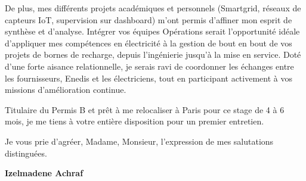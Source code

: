\documentclass[10pt,a4paper]{../altacv}
\begin{document}
\vspace{0.4cm}

De plus, mes différents projets académiques et personnels (Smartgrid, réseaux de capteurs IoT, supervision sur dashboard) m'ont permis d'affiner mon esprit de synthèse et d'analyse. Intégrer vos équipes Opérations serait l'opportunité idéale d'appliquer mes compétences en électricité à la gestion de bout en bout de vos projets de bornes de recharge, depuis l'ingénierie jusqu'à la mise en service. Doté d'une forte aisance relationnelle, je serais ravi de coordonner les échanges entre les fournisseurs, Enedis et les électriciens, tout en participant activement à vos missions d'amélioration continue. 

\vspace{0.4cm}

Titulaire du Permis B et prêt à me relocaliser à Paris pour ce stage de 4 à 6 mois, je me tiens à votre entière disposition pour un premier entretien. 

\vspace{0.5cm}

Je vous prie d'agréer, Madame, Monsieur, l'expression de mes salutations distinguées.

\vfill

\begin{flushright}
  \Large\color{emphasis}\textbf{Izelmadene Achraf}
\end{flushright}
\end{document}
